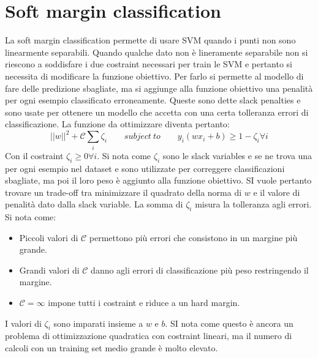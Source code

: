 \section{Soft margin classification}
La soft margin classification permette di usare SVM quando i punti non sono linearmente separabili.
Quando qualche dato non \`e lineramente separabile non si riescono a soddisfare i due costraint necessari per train le SVM e pertanto si necessita di modificare la funzione obiettivo.
Per farlo si permette al modello di fare delle predizione sbagliate, ma si aggiunge alla funzione obiettivo una penalit\`a per ogni esempio classificato erroneamente.
Queste sono dette slack penalties e sono usate per ottenere un modello che accetta con una certa tolleranza errori di classificazione.
La funzione da ottimizzare diventa pertanto:
$$||w||^2+\mathcal{C}\sum_i\zeta_i\qquad subject\ to\qquad y_i(wx_i+b)\ge 1 -\zeta_i\forall i$$
Con il costraint $\zeta_i\ge 0\forall i$.
Si nota come $\zeta_i$ sono le slack variables e se ne trova una per ogni esempio nel dataset e sono utilizzate per correggere classificazioni sbagliate, ma poi il loro peso \`e aggiunto alla funzione obiettivo.
SI vuole pertanto trovare un trade-off tra minimizzare il quadrato della norma di $w$ e il valore di penalit\`a dato dalla slack variable.
La somma di $\zeta_i$ misura la tolleranza agli errori.
Si nota come:
\begin{multicols}{2}
	\begin{itemize}
		\item Piccoli valori di $\mathcal{C}$ permettono pi\`u errori che consistono in un margine pi\`u grande.
		\item Grandi valori di $\mathcal{C}$ danno agli errori di classificazione pi\`u peso restringendo il margine.
		\item $\mathcal{C} = \infty$ impone tutti i costraint e riduce a un hard margin.
	\end{itemize}
\end{multicols}
I valori di $\zeta_i$ sono imparati insieme a $w$ e $b$.
SI nota come questo \`e ancora un problema di ottimizzazione quadratica con costraint lineari, ma il numero di calcoli con un training set medio grande \`e molto elevato.

